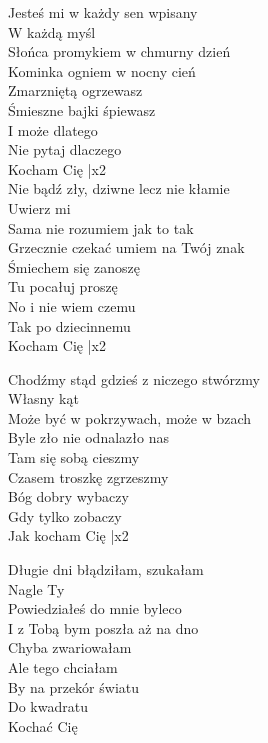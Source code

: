 \begin{text}
    Jesteś mi w każdy sen wpisany\\
    W każdą myśl\\
    Słońca promykiem w chmurny dzień\\
    Kominka ogniem w nocny cień\\
    Zmarzniętą ogrzewasz\\
    Śmieszne bajki śpiewasz\\
    I może dlatego\\
    Nie pytaj dlaczego\\
    Kocham Cię |x2\\

    Nie bądź zły, dziwne lecz nie kłamie\\
    Uwierz mi\\
    Sama nie rozumiem jak to tak\\
    Grzecznie czekać umiem na Twój znak\\
    Śmiechem się zanoszę\\
    Tu pocałuj proszę\\
    No i nie wiem czemu\\
    Tak po dziecinnemu\\
    Kocham Cię |x2

    Chodźmy stąd gdzieś z niczego stwórzmy\\
    Własny kąt\\
    Może być w pokrzywach, może w bzach\\
    Byle zło nie odnalazło nas\\
    Tam się sobą cieszmy\\
    Czasem troszkę zgrzeszmy\\
    Bóg dobry wybaczy\\
    Gdy tylko zobaczy\\
    Jak kocham Cię |x2

    Długie dni błądziłam, szukałam\\
    Nagle Ty\\
    Powiedziałeś do mnie byleco\\
    I z Tobą bym poszła aż na dno\\
    Chyba zwariowałam\\
    Ale tego chciałam\\
    By na przekór światu\\
    Do kwadratu\\
    Kochać Cię
\end{text}
\begin{chord}

\end{chord}